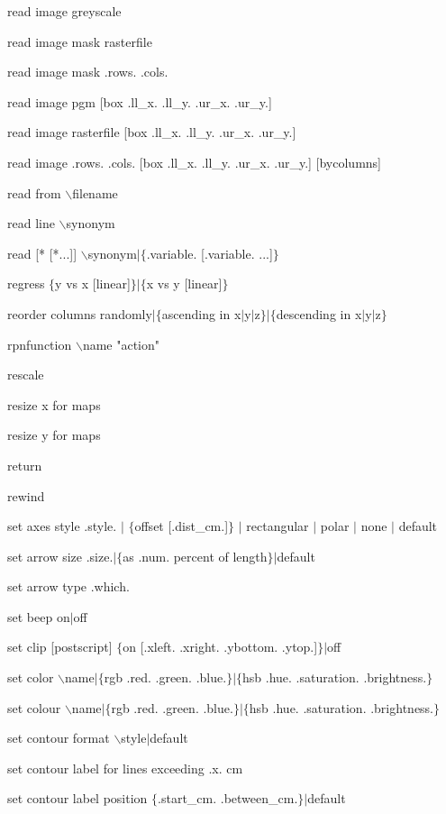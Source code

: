 read image greyscale

read image mask rasterfile

read image mask .rows. .cols.

read image pgm [box .ll\_x. .ll\_y. .ur\_x. .ur\_y.]

read image rasterfile [box .ll\_x. .ll\_y. .ur\_x. .ur\_y.]

read image .rows. .cols. [box .ll\_x. .ll\_y. .ur\_x. .ur\_y.] [bycolumns]

read from $\backslash$filename

read line $\backslash$synonym

read [* [*...]] $\backslash$synonym$\mid$$\lbrace$.variable. [.variable. ...]$\rbrace$

regress $\lbrace$y vs x [linear]$\rbrace$$\mid$$\lbrace$x vs y [linear]$\rbrace$

reorder columns randomly$\mid$$\lbrace$ascending in x$\mid$y$\mid$z$\rbrace$$\mid$$\lbrace$descending in x$\mid$y$\mid$z$\rbrace$

rpnfunction $\backslash$name "action"

rescale

resize x for maps

resize y for maps

return

rewind

set axes style .style. $\mid$ $\lbrace$offset [.dist\_cm.]$\rbrace$ $\mid$ rectangular $\mid$ polar $\mid$ none $\mid$ default

set arrow size .size.$\mid$$\lbrace$as .num. percent of length$\rbrace$$\mid$default

set arrow type .which.

set beep on$\mid$off

set clip [postscript] $\lbrace$on [.xleft. .xright. .ybottom. .ytop.]$\rbrace$$\mid$off

set color $\backslash$name$\mid$$\lbrace$rgb .red. .green. .blue.$\rbrace$$\mid$$\lbrace$hsb .hue. .saturation. .brightness.$\rbrace$

set colour $\backslash$name$\mid$$\lbrace$rgb .red. .green. .blue.$\rbrace$$\mid$$\lbrace$hsb .hue. .saturation. .brightness.$\rbrace$

set contour format $\backslash$style$\mid$default

set contour label for lines exceeding .x. cm

set contour label position $\lbrace$.start\_cm. .between\_cm.$\rbrace$$\mid$default

